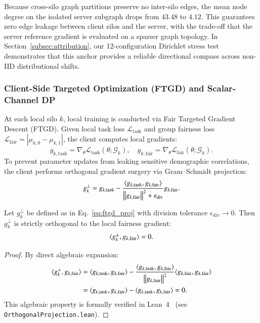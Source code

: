 Because cross-silo graph partitions preserve no inter-silo edges, the mean node degree on the isolated server subgraph drops from $43.48$ to $4.12$. This guarantees zero edge leakage between client silos and the server, with the trade-off that the server reference gradient is evaluated on a sparser graph topology. In Section~\ref{subsec:attribution}, our 12-configuration Dirichlet stress test demonstrates that this anchor provides a reliable directional compass across non-IID distributional shifts.

\subsubsection{Client-Side Targeted Optimization (FTGD) and Scalar-Channel DP}
At each local silo $k$, local training is conducted via Fair Targeted Gradient Descent (FTGD). Given local task loss $\mathcal{L}_{\mathrm{task}}$ and group fairness loss $\mathcal{L}_{\mathrm{fair}} = |\mu_{k,0} - \mu_{k,1}|$, the client computes local gradients:
\begin{equation}
\label{eq:local_grads}
g_{k,\mathrm{task}} = \nabla_\theta \mathcal{L}_{\mathrm{task}}(\theta; \mathcal{G}_k), \quad g_{k,\mathrm{fair}} = \nabla_\theta \mathcal{L}_{\mathrm{fair}}(\theta; \mathcal{G}_k).
\end{equation}
To prevent parameter updates from leaking sensitive demographic correlations, the client performs orthogonal gradient surgery via Gram--Schmidt projection:
\begin{equation}
\label{eq:ftgd_proj}
g_k^{\perp} = g_{k,\mathrm{task}} - \frac{\langle g_{k,\mathrm{task}}, g_{k,\mathrm{fair}} \rangle}{\left\lVert g_{k,\mathrm{fair}} \right\rVert^2 + \epsilon_{\mathrm{div}}} g_{k,\mathrm{fair}}.
\end{equation}

\begin{theorem}
\label{thm:ftgd_orthogonality}
Let $g_k^{\perp}$ be defined as in Eq.~\eqref{eq:ftgd_proj} with division tolerance $\epsilon_{\mathrm{div}} \to 0$. Then $g_k^{\perp}$ is strictly orthogonal to the local fairness gradient:
\begin{equation}
\label{eq:ortho_identity}
\langle g_k^{\perp}, g_{k,\mathrm{fair}} \rangle = 0.
\end{equation}
\end{theorem}
\begin{proof}
By direct algebraic expansion:
\begin{align*}
\langle g_k^{\perp}, g_{k,\mathrm{fair}} \rangle &= \langle g_{k,\mathrm{task}}, g_{k,\mathrm{fair}} \rangle - \frac{\langle g_{k,\mathrm{task}}, g_{k,\mathrm{fair}} \rangle}{\left\lVert g_{k,\mathrm{fair}} \right\rVert^2} \langle g_{k,\mathrm{fair}}, g_{k,\mathrm{fair}} \rangle \\
&= \langle g_{k,\mathrm{task}}, g_{k,\mathrm{fair}} \rangle - \langle g_{k,\mathrm{task}}, g_{k,\mathrm{fair}} \rangle = 0.
\end{align*}
This algebraic property is formally verified in Lean~4~\citep{demoura2021lean} (see \texttt{Orthogonal}\allowbreak\texttt{Projection.lean}).
\end{proof}

